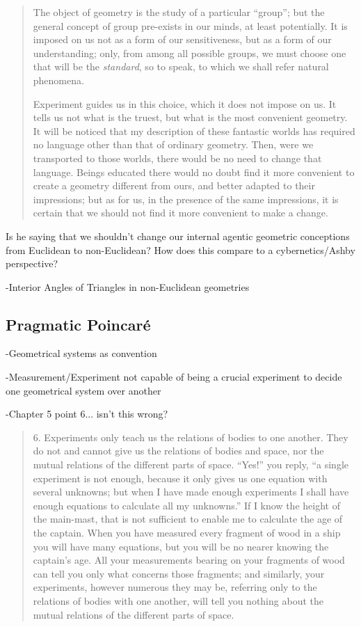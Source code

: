\documentclass{article}
\begin{document}
\begin{quote}
    The object of geometry is the study of a particular ``group''; but the general concept of group pre-exists in our minds, at least potentially.  It is imposed on us not as a form of our sensitiveness, but as a form of our understanding; only, from among all possible groups, we must choose one that will be the \emph{standard}, so to speak, to which we shall refer natural phenomena.
    
    Experiment guides us in this choice, which it does not impose on us.  It tells us not what is the truest, but what is the most convenient geometry.  It will be noticed that my description of these fantastic worlds has required no language other than that of ordinary geometry.  Then, were we transported to those worlds, there would be no need to change that language.  Beings educated there would no doubt find it more convenient to create a geometry different from ours, and better adapted to their impressions; but as for us, in the presence of the same impressions, it is certain that we should not find it more convenient to make a change.
    
    \citep[p. 70-71]{Poincare1952}
\end{quote}

Is he saying that we shouldn't change our internal agentic geometric conceptions from Euclidean to non-Euclidean?  How does this compare to a cybernetics/Ashby perspective?

-Interior Angles of Triangles in non-Euclidean geometries

\subsection{Pragmatic Poincar\'e}

-Geometrical systems as convention

-Measurement/Experiment not capable of being a crucial experiment to decide one geometrical system over another

-Chapter 5 point 6... isn't this wrong?

\begin{quote}
    6.  Experiments only teach us the relations of bodies to one another.  They do not and cannot give us the relations of bodies and space, nor the mutual relations of the different parts of space.  ``Yes!'' you reply, ``a single experiment is not enough, because it only gives us one equation with several unknowns; but when I have made enough experiments I shall have enough equations to calculate all my unknowns.''  If I know the height of the main-mast, that is not sufficient to enable me to calculate the age of the captain.  When you have measured every fragment of wood in a ship you will have many equations, but you will be no nearer knowing the captain's age.  All your measurements bearing on your fragments of wood can tell you only what concerns those fragments; and similarly, your experiments, however numerous they may be, referring only to the relations of bodies with one another, will tell you nothing about the mutual relations of the different parts of space.
    
    \citep[p. 79-80]{Poincare1952}
\end{quote}
\end{document}

